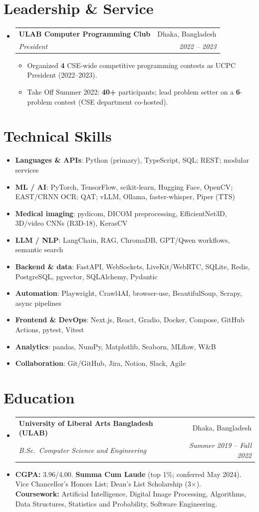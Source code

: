 \documentclass[a4paper,11pt]{article}
\makeatletter
\newcommand{\resumeItem}[2]{
  \item\small{
    \textbf{#1}{: #2 \vspace{-2pt}}
  }
}
\newcommand{\resumeSubheading}[4]{
  \vspace{-1pt}\item
    \begin{tabular*}{0.97\textwidth}{l@{\extracolsep{\fill}}r}
      \textbf{#1} & #2 \\
      \textit{#3} & \textit{#4} \\
    \end{tabular*}\vspace{-5pt}
}
\newcommand{\resumeSubItem}[2]{\resumeItem{#1}{#2}\vspace{-3pt}}
\newcommand{\resumeSubHeadingListStart}{\begin{itemize}[leftmargin=*]}
\newcommand{\resumeSubHeadingListEnd}{\end{itemize}}
\newcommand{\resumeItemListStart}{\begin{itemize}[itemsep=2pt,parsep=0pt,topsep=3pt,leftmargin=14pt]}
\newcommand{\resumeItemListEnd}{\end{itemize}\vspace{-4pt}}
\makeatother
\begin{document}
\section{Leadership \& Service}
\resumeSubHeadingListStart
\resumeSubheading{ULAB Computer Programming Club}{Dhaka, Bangladesh}
{President}{2022 -- 2023}
\resumeItemListStart
    \item Organized \textbf{4} CSE-wide competitive programming contests as UCPC President (2022--2023).
    \item Take Off Summer 2022: \textbf{40+} participants; lead problem setter on a \textbf{6}-problem contest (CSE department co-hosted).
\resumeItemListEnd
\resumeSubHeadingListEnd

\section{Technical Skills}
\resumeSubHeadingListStart
\resumeSubItem{Languages \& APIs}{Python (primary), TypeScript, SQL; REST; modular services}
\resumeSubItem{ML / AI}{PyTorch, TensorFlow, scikit-learn, Hugging Face, OpenCV; EAST/CRNN OCR; QAT; vLLM, Ollama, faster-whisper, Piper (TTS)}
\resumeSubItem{Medical imaging}{pydicom, DICOM preprocessing, EfficientNet3D, 3D/video CNNs (R3D-18), KerasCV}
\resumeSubItem{LLM / NLP}{LangChain, RAG, ChromaDB, GPT/Qwen workflows, semantic search}
\resumeSubItem{Backend \& data}{FastAPI, WebSockets, LiveKit/WebRTC, SQLite, Redis, PostgreSQL, pgvector, SQLAlchemy, Pydantic}
\resumeSubItem{Automation}{Playwright, Crawl4AI, browser-use, BeautifulSoup, Scrapy, async pipelines}
\resumeSubItem{Frontend \& DevOps}{Next.js, React, Gradio, Docker, Compose, GitHub Actions, pytest, Vitest}
\resumeSubItem{Analytics}{pandas, NumPy, Matplotlib, Seaborn, MLflow, W\&B}
\resumeSubItem{Collaboration}{Git/GitHub, Jira, Notion, Slack, Agile}
\resumeSubHeadingListEnd


\section{Education}
\resumeSubHeadingListStart
\resumeSubheading
  {University of Liberal Arts Bangladesh (ULAB)}{Dhaka, Bangladesh}
  {B.Sc.\ Computer Science and Engineering}{Summer 2019 -- Fall 2022}
\item[] \small
  \textbf{CGPA:} 3.96/4.00. \textbf{Summa Cum Laude} (top 1\%; conferred May 2024). Vice Chancellor's Honors List; Dean's List Scholarship (3$\times$). \\
  \textbf{Coursework:} Artificial Intelligence, Digital Image Processing, Algorithms, Data Structures, Statistics and Probability, Software Engineering.
\resumeSubHeadingListEnd
\end{document}
